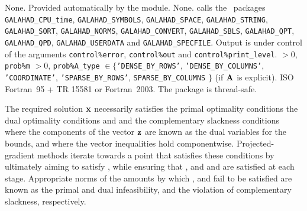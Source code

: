 \documentclass{galahad}
\newcommand{\packagename}{BLLS}
\begin{document}

\galgeneral

\galcommon None.
\galworkspace Provided automatically by the module.
\galroutines None.
\galmodules {\tt \packagename\_solve} calls the \galahad\ packages
{\tt GALAHAD\_CPU\_time},
{\tt GALAHAD\_SY\-M\-BOLS}, \newline
{\tt GALAHAD\_SPACE},
{\tt GALAHAD\_STRING},
{\tt GALAHAD\_SORT},
{\tt GALAHAD\_NORMS},
{\tt GALAHAD\_CONVERT},
{\tt GALAHAD\_SBLS}, \newline
{\tt GALAHAD\_QPT},
{\tt GALAHAD\_QPD},
{\tt GALAHAD\_USERDATA} and
{\tt GALAHAD\_SPECFILE}.
\galio Output is under control of the arguments
 {\tt control\%error}, {\tt control\%out} and {\tt control\%print\_level}.
 $> 0$, {\tt prob\%m} $> 0$,
{\tt prob\%A\_type} $\in \{${\tt 'DENSE\_BY\_ROWS'}, {\tt 'DENSE\_BY\_COLUMNS'},
 {\tt 'COORDINATE'}, {\tt 'SPARSE\_BY\_\-ROWS'},
 {\tt SPARSE\_BY\_COLUMNS} $\}$
(if ${\mathbf{A}}$ is explicit).
\galportability ISO Fortran~95 + TR 15581 or Fortran~2003.
The package is thread-safe.


\galmethod
The required solution ${\mathbf{x}}$ necessarily satisfies
the primal optimality conditions
the dual optimality conditions
and
and the complementary slackness conditions
where the components of the vector ${\mathbf{z}}$ are known as
the dual variables for the bounds,
and where the vector inequalities hold componentwise.
Projected-gradient methods iterate towards a point
that satisfies these conditions by ultimately aiming to satisfy
, while ensuring that
, and  and  are satisfied at each stage.
Appropriate norms of the amounts by
which ,  and  fail to be satisfied are known as the
primal and dual infeasibility, and the violation of complementary slackness,
respectively.
\end{document}
